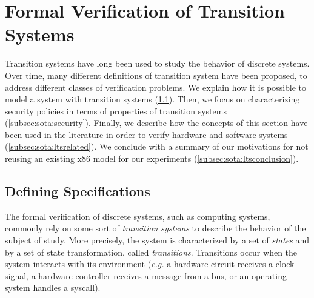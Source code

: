
\section{Formal Verification of Transition Systems}
\label{sec:sota:formalisms}

Transition systems have long been used to study the behavior of discrete
systems.  
%
Over time, many different definitions of transition system have been proposed,
to address different classes of verification problems.
%
We explain how it is possible to model a system with transition systems
(\ref{subsec:sota:ltsdef}).
%
Then, we focus on characterizing security policies in terms of properties of
transition systems (\ref{subsec:sota:security}).
%
Finally, we describe how the concepts of this section have been used in the
literature in order to verify hardware and software systems
(\ref{subsec:sota:ltsrelated}).
%
We conclude with a summary of our motivations for not reusing an existing x86
model for our experiments (\ref{subsec:sota:ltsconclusion}). 

\subsection{Defining Specifications}
\label{subsec:sota:ltsdef}


The formal verification of discrete systems, such as computing systems, commonly
rely on some sort of \emph{transition systems} to describe the behavior of the
subject of study.  
%
More precisely, the system is characterized by a set of \emph{states} and by a
set of state transformation, called \emph{transitions}.
%
Transitions occur when the system interacts with its environment (\emph{e.g.} a
hardware circuit receives a clock signal, a hardware controller receives a
message from a bus, or an operating system handles a syscall).

